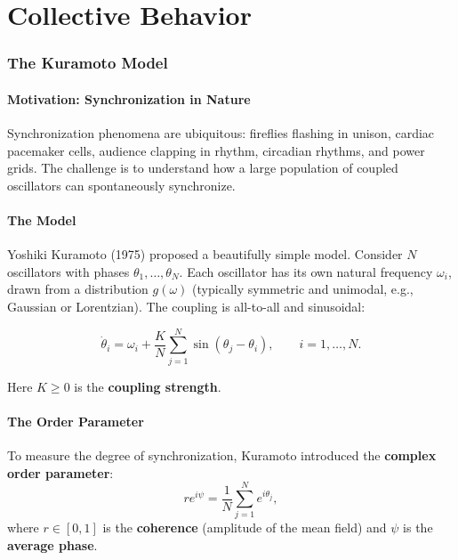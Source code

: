 \documentclass[11pt,letterpaper]{article}
\theoremstyle{definition}
\theoremstyle{plain}
\theoremstyle{remark}
\begin{document}
\part{Collective Behavior}

\section{The Kuramoto Model}\label{sec:kuramoto}

\subsection{Motivation: Synchronization in Nature}

Synchronization phenomena are ubiquitous: fireflies flashing in unison,
cardiac pacemaker cells, audience clapping in rhythm, circadian rhythms, and
power grids.  The challenge is to understand how a large population of
coupled oscillators can spontaneously synchronize.

\subsection{The Model}

Yoshiki Kuramoto (1975) proposed a beautifully simple model.  Consider $N$
oscillators with phases $\theta_1, \ldots, \theta_N$.  Each oscillator has
its own natural frequency $\omega_i$, drawn from a distribution $g(\omega)$
(typically symmetric and unimodal, e.g., Gaussian or Lorentzian).  The
coupling is all-to-all and sinusoidal:

\begin{equation}\label{eq:kuramoto}
\boxed{
  \dot{\theta}_i = \omega_i + \frac{K}{N}\sum_{j=1}^{N}
  \sin(\theta_j - \theta_i), \qquad i = 1,\ldots,N.
}
\end{equation}

Here $K \ge 0$ is the \textbf{coupling strength}.

\subsection{The Order Parameter}

To measure the degree of synchronization, Kuramoto introduced the
\textbf{complex order parameter}:
\begin{equation}\label{eq:order-param}
  re^{i\psi} = \frac{1}{N}\sum_{j=1}^{N} e^{i\theta_j},
\end{equation}
where $r\in[0,1]$ is the \textbf{coherence} (amplitude of the mean field)
and $\psi$ is the \textbf{average phase}.
\end{document}
